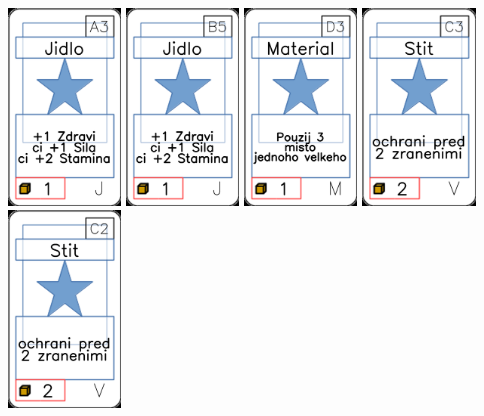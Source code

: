 \documentclass[a4paper]{article}
\begin{document}
	\includegraphics[width=3.0cm]{img-1_2}
	\includegraphics[width=3.0cm]{img-1_9}
	\includegraphics[width=3.0cm]{img-1_47}
	\includegraphics[width=3.0cm]{img-1_72}
	\includegraphics[width=3.0cm]{img-1_71}
\end{document}
